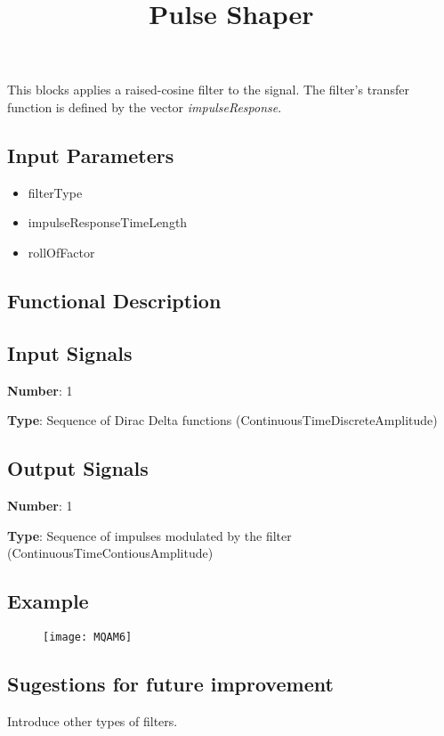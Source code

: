 \documentclass[a4paper]{article}
\title{Pulse Shaper}
\begin{document}
\maketitle

This blocks applies a raised-cosine filter to the signal. The filter's transfer function is defined by the vector \textit{impulseResponse}.

\subsection*{Input Parameters}

\begin{itemize}
	\item filterType
	\item impulseResponseTimeLength
	\item rollOfFactor
\end{itemize}

\subsection*{Functional Description}

\subsection*{Input Signals}

\textbf{Number}: 1

\textbf{Type}: Sequence of Dirac Delta functions (ContinuousTimeDiscreteAmplitude)

\subsection*{Output Signals}

\textbf{Number}: 1

\textbf{Type}: Sequence of impulses modulated by the filter (ContinuousTimeContiousAmplitude)

\subsection*{Example}

\begin{figure}[h]
	\texttt{[image: MQAM6]}
\end{figure}

\subsection*{Sugestions for future improvement}

Introduce other types of filters.
\end{document}
